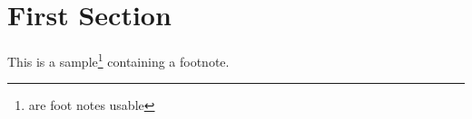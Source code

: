 

\section{First {\bf Section}}

This is a sample\footnote{are foot notes usable} containing
a footnote.


